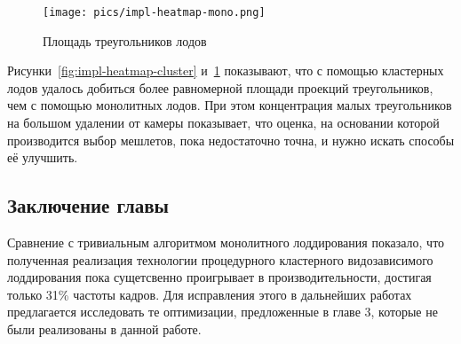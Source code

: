 \begin{figure}[H]
    \texttt{[image: pics/impl-heatmap-mono.png]}
    \caption{Площадь треугольников лодов}
    \label{fig:impl-heatmap-mono}
\end{figure}

Рисунки~\ref{fig:impl-heatmap-cluster} и~\ref{fig:impl-heatmap-mono} показывают, что с помощью кластерных лодов удалось добиться более равномерной площади проекций треугольников, чем с помощью монолитных лодов.
При этом концентрация малых треугольников на большом удалении от камеры показывает, что оценка, на основании которой производится выбор мешлетов, пока недостаточно точна, и нужно искать способы её улучшить.




\subsection*{Заключение главы}
Сравнение с тривиальным алгоритмом монолитного лоддирования показало, что полученная реализация технологии процедурного кластерного видозависимого лоддирования пока сущетсвенно проигрывает в производительности, достигая только 31\% частоты кадров.
Для исправления этого в дальнейших работах предлагается исследовать те оптимизации, предложенные в главе 3, которые не были реализованы в данной работе.
